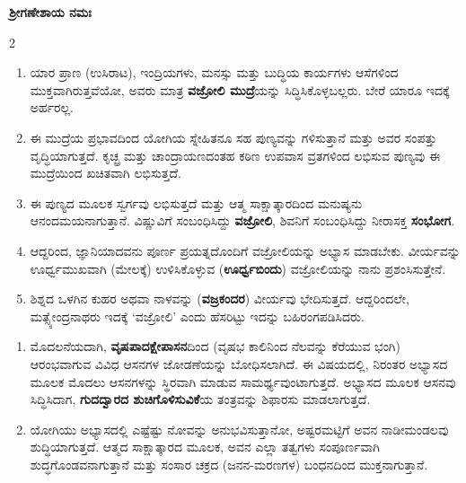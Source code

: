 \newpage
\null\vspace{0.1cm}

\begin{kan}

\centerline{}
\vskip 7pt

\centerline{{\Large\bfseries ಶ್ರೀಗಣೇಶಾಯ ನಮಃ}}
\end{kan}


\begin{multicols}{2}
\begin{kan}


\begin{enumerate}[nosep]
\itemsep=0pt
\item[1.]  ಯಾರ ಪ್ರಾಣ (ಉಸಿರಾಟ), ಇಂದ್ರಿಯಗಳು, ಮನಸ್ಸು ಮತ್ತು ಬುದ್ಧಿಯ ಕಾರ್ಯಗಳು ಆಸೆಗಳಿಂದ ಮುಕ್ತವಾಗಿರುತ್ತವೆಯೋ, ಅವರು ಮಾತ್ರ \textbf{ವಜ್ರೋಲಿ ಮುದ್ರೆ}ಯನ್ನು ಸಿದ್ಧಿಸಿಕೊಳ್ಳಬಲ್ಲರು. ಬೇರೆ ಯಾರೂ ಇದಕ್ಕೆ ಅರ್ಹರಲ್ಲ.
\item[2.] ಈ ಮುದ್ರೆಯ ಪ್ರಭಾವದಿಂದ ಯೋಗಿಯ ಸ್ನೇಹಿತನೂ ಸಹ ಪುಣ್ಯವನ್ನು ಗಳಿಸುತ್ತಾನೆ ಮತ್ತು ಅವರ ಸಂಪತ್ತು ವೃದ್ಧಿಯಾಗುತ್ತದೆ. ಕೃಚ್ಛ್ರ ಮತ್ತು ಚಾಂದ್ರಾಯಣದಂತಹ ಕಠಿಣ ಉಪವಾಸ ವ್ರತಗಳಿಂದ ಲಭಿಸುವ ಪುಣ್ಯವು ಈ ಮುದ್ರೆಯಿಂದ ಖಚಿತವಾಗಿ ಲಭಿಸುತ್ತದೆ.
\item[3.] ಈ ಪುಣ್ಯದ ಮೂಲಕ ಸ್ವರ್ಗವು ಲಭಿಸುತ್ತದೆ ಮತ್ತು ಆತ್ಮ ಸಾಕ್ಷಾತ್ಕಾರದಿಂದ ಮನುಷ್ಯನು ಆನಂದಮಯನಾಗುತ್ತಾನೆ. ವಿಷ್ಣುವಿಗೆ ಸಂಬಂಧಿಸಿದ್ದು \textbf{ವಜ್ರೋಲಿ}, ಶಿವನಿಗೆ ಸಂಬಂಧಿಸಿದ್ದು ನೀರಾಸಕ್ತ \textbf{ಸಂಭೋಗ}.
\item[4.] ಆದ್ದರಿಂದ, ಜ್ಞಾನಿಯಾದವನು ಪೂರ್ಣ ಪ್ರಯತ್ನದೊಂದಿಗೆ ವಜ್ರೋಲಿಯನ್ನು ಅಭ್ಯಾಸ ಮಾಡಬೇಕು. ವೀರ್ಯವನ್ನು ಊರ್ಧ್ವಮುಖವಾಗಿ (ಮೇಲಕ್ಕೆ) ಉಳಿಸಿಕೊಳ್ಳುವ (\textbf{ಊರ್ಧ್ವಬಿಂದು}) ವಜ್ರೋಲಿಯನ್ನು ನಾನು ಪ್ರಶಂಸಿಸುತ್ತೇನೆ.
\item[5.] ಶಿಶ್ನದ ಒಳಗಿನ ಕುಹರ ಅಥವಾ ನಾಳವನ್ನು (\textbf{ವಜ್ರಕಂದರ}) ವೀರ್ಯವು ಭೇದಿಸುತ್ತದೆ. ಆದ್ದರಿಂದಲೇ, ಮತ್ಸ್ಯೇಂದ್ರನಾಥರು ಇದಕ್ಕೆ ‘ವಜ್ರೋಲಿ’
 ಎಂದು ಹೆಸರಿಟ್ಟು ಇದನ್ನು ಬಹಿರಂಗಪಡಿಸಿದರು.
\end{enumerate}
\vskip 5pt

\vskip 5pt


\begin{enumerate}[nosep]
\item[6.] ಮೊದಲನೆಯದಾಗಿ, \textbf{ವೃಷಪಾದಕ್ಷೇಪಾಸನ}ದಿಂದ (ವೃಷಭ ಕಾಲಿನಿಂದ ನೆಲವನ್ನು ಕೆರೆಯುವ ಭಂಗಿ) ಆರಂಭವಾಗುವ ವಿವಿಧ ಆಸನಗಳ ಜೋಡಣೆಯನ್ನು ಬೋಧಿಸಲಾಗಿದೆ. ಈ ವಿಷಯದಲ್ಲಿ, ನಿರಂತರ ಅಭ್ಯಾಸದ ಮೂಲಕ ಮೊದಲು ಆಸನಗಳನ್ನು ಸ್ಥಿರವಾಗಿ ಮಾಡುವ ಸಾಮರ್ಥ್ಯವುಂಟಾಗುತ್ತದೆ. ಅಭ್ಯಾಸದ ಮೂಲಕ ಆಸನವು ಸಿದ್ಧಿಸಿದಾಗ, \textbf{ಗುದದ್ವಾರದ ಶುಚಿಗೊಳಿಸುವಿಕೆ}ಯ ತಂತ್ರವನ್ನು ಶಿಫಾರಸು ಮಾಡಲಾಗುತ್ತದೆ.
\item[7.] ಯೋಗಿಯು ಅಭ್ಯಾಸದಲ್ಲಿ ಎಷ್ಟೆಷ್ಟು ನೋವನ್ನು ಅನುಭವಿಸುತ್ತಾನೋ, ಅಷ್ಟರಮಟ್ಟಿಗೆ ಅವನ ನಾಡೀಮಂಡಲವು ಶುದ್ಧಿಯಾಗುತ್ತದೆ. ಆತ್ಮದ ಸಾಕ್ಷಾತ್ಕಾರದ ಮೂಲಕ, ಅವನ ಎಲ್ಲಾ ತತ್ವಗಳು ಸಂಪೂರ್ಣವಾಗಿ ಶುದ್ಧಗೊಂಡವನಾಗುತ್ತಾನೆ ಮತ್ತು ಸಂಸಾರ ಚಕ್ರದ (ಜನನ-ಮರಣಗಳ) ಬಂಧನದಿಂದ ಮುಕ್ತನಾಗುತ್ತಾನೆ.
\end{enumerate}
\vskip 5pt


\end{kan}
\end{multicols}
